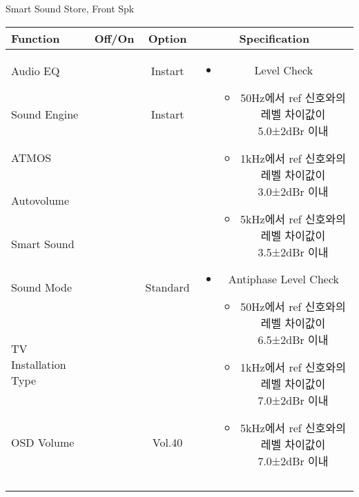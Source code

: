 \begin{frame}[t]{Smart Sound Store, Front Spk}
\begin{tiny}
\begin{tabular}{@{}lccc@{}}
\toprule
Function & Off/On & Option & Specification \\
\midrule
Audio EQ & \color{black}{Off} & Instart &
\multirow{10}{60mm}{
\begin{itemize}
	\item Level Check
	\begin{itemize}
		\item 50Hz에서 ref 신호와의 레벨 차이값이 5.0±2dBr 이내
		\item 1kHz에서 ref 신호와의 레벨 차이값이 3.0±2dBr 이내
		\item 5kHz에서 ref 신호와의 레벨 차이값이 3.5±2dBr 이내
	\end{itemize}
	\item Antiphase Level Check
	\begin{itemize}
		\item 50Hz에서 ref 신호와의 레벨 차이값이 6.5±2dBr 이내
		\item 1kHz에서 ref 신호와의 레벨 차이값이 7.0±2dBr 이내
		\item 5kHz에서 ref 신호와의 레벨 차이값이 7.0±2dBr 이내
	\end{itemize}
\end{itemize}
} \\
Sound Engine & \color{blue}{On} & Instart & \\
ATMOS & \color{black}{Off}  & & \\
Autovolume & \color{black}{Off} & & \\
Smart Sound & \color{blue}{On} & & \\
Sound Mode & \color{blue}{On} & Standard & \\
TV Installation Type & \color{blue}{On} & \color{black}{Standtype1} & \\
OSD Volume & \color{blue}{On} & Vol.40 & \\
& & & \\
& & & \\
& & & \\
& & & \\
\midrule
\end{tabular}
\end{tiny}

\end{frame}


